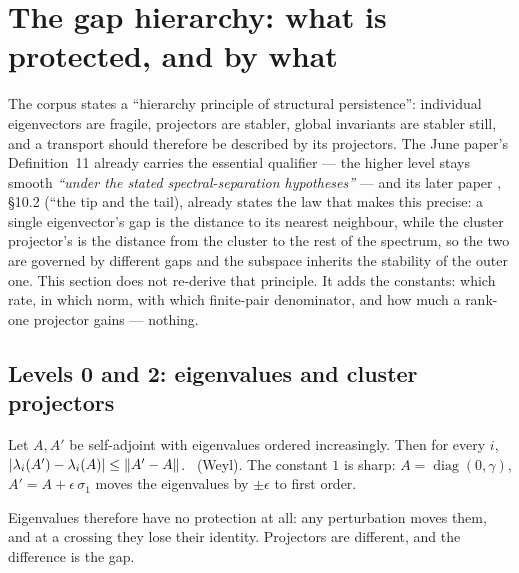 \section{The gap hierarchy: what is protected, and by what}\label{sec:hierarchy}

The corpus states a ``hierarchy principle of structural persistence'': individual eigenvectors
are fragile, projectors are stabler, global invariants are stabler still, and a transport
should therefore be described by its projectors. The June paper's Definition~11 \Cc{}
\cite{corpus} already carries the essential qualifier --- the higher level stays smooth
\emph{``under the stated spectral-separation hypotheses''} --- and its later paper \Cc{}
\cite{iqgt}, \S10.2
(``the tip and the tail), already states the law that makes this precise: a single
eigenvector's gap is the distance to its nearest neighbour, while the cluster projector's is
the distance from the cluster to the rest of the spectrum, so the two are governed by
different gaps and the subspace inherits the stability of the outer one. This section does
not re-derive that principle. It adds the constants: which rate, in which norm, with which
finite-pair denominator, and how much a rank-one projector gains --- nothing.

\subsection{Levels 0 and 2: eigenvalues and cluster projectors}

\begin{theorem}[Weyl]\label{thm:weyl}
Let $A,A'$ be self-adjoint with eigenvalues ordered increasingly. Then for every $i$,
$\lvert\lambda_i(A')-\lambda_i(A)\rvert\le\lVert A'-A\rVert$.
\Cc\ (Weyl). The constant $1$ is sharp: $A=\operatorname{diag}(0,\gamma)$,
$A'=A+\epsilon\,\sigma_1$ moves the eigenvalues by $\pm\epsilon$ to first order.
\end{theorem}

Eigenvalues therefore have no protection at all: any perturbation moves them, and at a crossing
they lose their identity. Projectors are different, and the difference is the gap.

